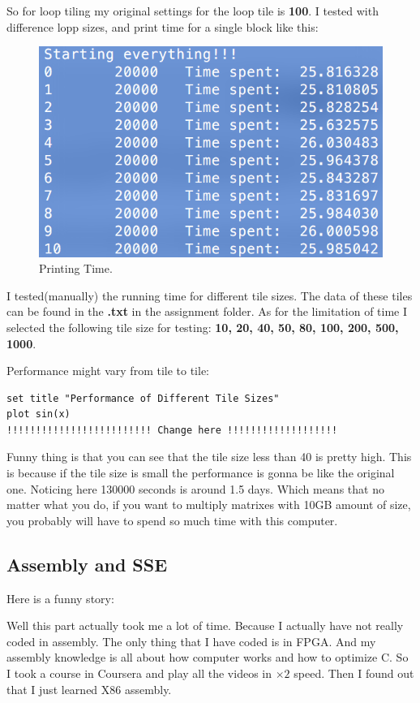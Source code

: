 \documentclass[11pt]{article}
\begin{document}
So for loop tiling my original settings for the loop tile is \textbf{100}. I tested with difference lopp sizes, and print time for a single block like this:
\begin{figure}[htb]
\centering
\includegraphics[width=.9\linewidth]{./tileexample.png}
\caption{\label{fig:orgparagraph2}
Printing Time.}
\end{figure}

I tested(manually) the running time for different tile sizes. The data of these tiles can be found in the \textbf{.txt} in the assignment folder. As for the limitation of
time I selected the following tile size for testing: \textbf{10, 20, 40, 50, 80, 100, 200, 500, 1000}. 

Performance might vary from tile to tile:
\begin{verbatim}
set title "Performance of Different Tile Sizes"
plot sin(x)
!!!!!!!!!!!!!!!!!!!!!!!!! Change here !!!!!!!!!!!!!!!!!!!
\end{verbatim}

Funny thing is that you can see that the tile size less than 40 is pretty high. This is because if the tile size is small the performance 
is gonna be like the original one. Noticing here 130000 seconds is around 1.5 days. Which means that no matter what you do, if you want to multiply 
matrixes with 10GB  amount of size, you probably will have to spend so much time with this computer.

\subsection{Assembly and SSE}
\label{sec:orgheadline6}

Here is a funny story:

Well this part actually took me a lot of time. Because I actually have not really coded in assembly. The only thing that I have coded is in FPGA. And 
my assembly knowledge is all about how computer works and how to optimize C. So I took a course in Coursera and play all the videos in \(\times 2\) speed. 
Then I found out that I just learned X86 assembly. 
\end{document}
